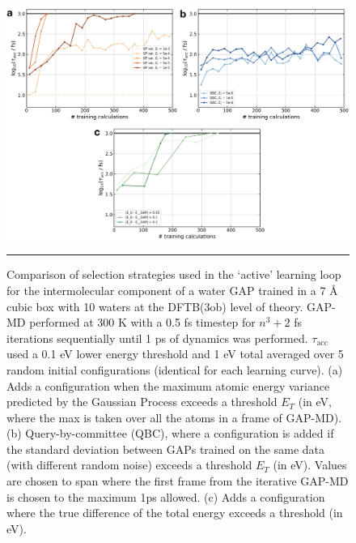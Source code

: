 \documentclass[../../main.tex]{subfiles}
\newcommand{\taua}{$\tau_\text{acc}$ }
\begin{document}
\begin{figure}[h!]
	\vspace{0.4cm}
	\centering
	\includegraphics[width=\textwidth]{6/gap/figs_si/fig25}
	\vspace{0.2cm}
	\hrule
	\caption{Comparison of selection strategies used in the ‘active’ learning loop for the intermolecular component of a water GAP trained in a 7 \AA$\;$cubic box with 10 waters at the DFTB(3ob) level of theory. GAP-MD performed at 300 K with a 0.5 fs timestep for $n^3+2$ fs iterations sequentially until 1 ps of dynamics was performed. \taua used a 0.1 eV lower energy threshold and 1 eV total averaged over 5 random initial configurations (identical for each learning curve). (a) Adds a configuration when the maximum atomic energy variance predicted by the Gaussian Process exceeds a threshold $E_T$ (in eV, where the max is taken over all the atoms in a frame of GAP-MD). (b) Query-by-committee (QBC), where a configuration is added if the standard deviation between GAPs trained on the same data (with different random noise) exceeds a threshold $E_T$ (in eV). Values are chosen to span where the first frame from the iterative GAP-MD is chosen to the maximum 1ps allowed. (c) Adds a configuration where the true difference of the total energy exceeds a threshold (in eV).}
	\label{fig::ml_si_25}
\end{figure}








\clearpage
\end{document}
